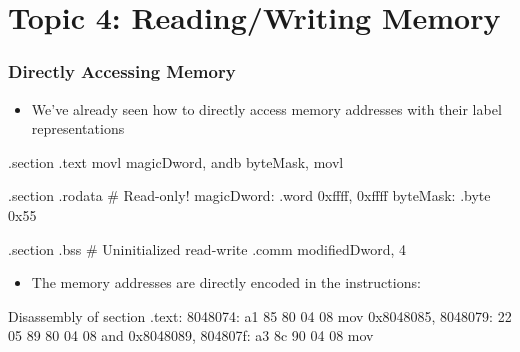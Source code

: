 \documentclass[11pt,xcolor=dvipsnames]{beamer}
\begin{document}
\section{Topic 4: Reading/Writing Memory}

\begin{frame}[fragile,t]
\frametitle{Directly Accessing Memory}
\begin{itemize}
  \item We've already seen how to directly access memory addresses with their label representations
\end{itemize}
\begin{gascode}
.section .text
movl magicDword, %
andb byteMask, %
movl %

.section .rodata          # Read-only!
magicDword: .word 0xffff, 0xffff
byteMask:   .byte 0x55

.section .bss             # Uninitialized read-write
.comm modifiedDword, 4
\end{gascode}
\begin{itemize}
  \item The memory addresses are directly encoded in the instructions:
\end{itemize}
\begin{customobjdumpcode}
Disassembly of section .text:
 8048074: a1 85 80 04 08        mov    0x8048085,%
 8048079: 22 05 89 80 04 08     and    0x8048089,%
 804807f: a3 8c 90 04 08        mov    %
\end{customobjdumpcode}
\end{frame}
\end{document}
